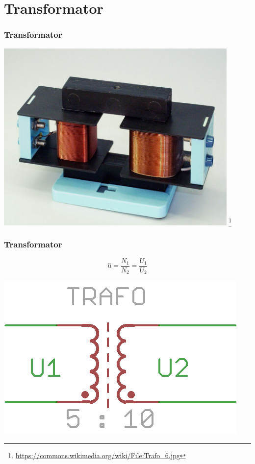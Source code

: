 \section*{Transformator}
\begin{frame}
    \frametitle{Transformator}
        \begin{center}
        \includegraphics[width=0.9\textwidth]{e06/trafo-Real.jpg}
        \footnote{\tiny \url{https://commons.wikimedia.org/wiki/File:Trafo_6.jpg}}
         \end{center}
\end{frame}

\begin{frame}
    \frametitle{Transformator}
    $$\text{\"u} = \frac{N_1}{N_2} = \frac{U_1}{U_2}$$
    \begin{center}
        \includegraphics[width=.7\textwidth]{e06/Trafo.png}
    \end{center}
\end{frame}

